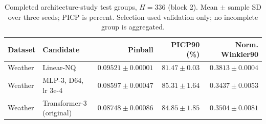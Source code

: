 \begin{table}[t]
\centering\small
\caption{Completed architecture-study test groups, $H=336$ (block 2). Mean $\pm$ sample SD over three seeds; PICP is percent. Selection used validation only; no incomplete group is aggregated.}
\label{tab:architecture-test-336-1}
\begin{tabular}{@{}llrrr@{}}
\toprule
Dataset & Candidate & Pinball & PICP90 (\%) & Norm. Winkler90 \\
\midrule
Weather & Linear-NQ & $0.09521\pm0.00001$ & $81.47\pm0.03$ & $0.3813\pm0.0004$ \\
Weather & MLP-3, D64, lr 3e-4 & $0.08597\pm0.00047$ & $85.31\pm1.64$ & $0.3437\pm0.0053$ \\
Weather & Transformer-3 (original) & $0.08748\pm0.00086$ & $84.85\pm1.85$ & $0.3504\pm0.0081$ \\
\bottomrule
\end{tabular}
\end{table}


